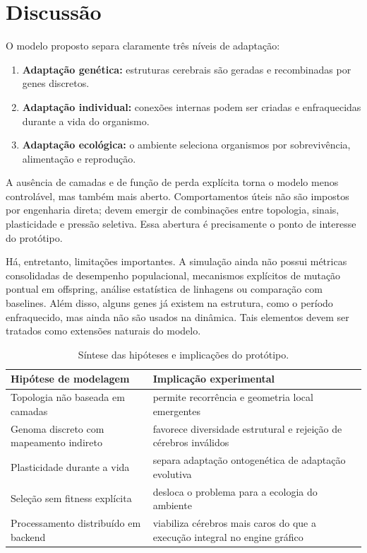 \documentclass[12pt,a4paper,fleqn]{article}
\begin{document}
\section{Discussão}

O modelo proposto separa claramente três níveis de adaptação:

\begin{enumerate}
	\item \textbf{Adaptação genética:} estruturas cerebrais são geradas e recombinadas por genes discretos.
	\item \textbf{Adaptação individual:} conexões internas podem ser criadas e enfraquecidas durante a vida do organismo.
	\item \textbf{Adaptação ecológica:} o ambiente seleciona organismos por sobrevivência, alimentação e reprodução.
\end{enumerate}

A ausência de camadas e de função de perda explícita torna o modelo menos controlável, mas também mais aberto. Comportamentos úteis não são impostos por engenharia direta; devem emergir de combinações entre topologia, sinais, plasticidade e pressão seletiva. Essa abertura é precisamente o ponto de interesse do protótipo.

Há, entretanto, limitações importantes. A simulação ainda não possui métricas consolidadas de desempenho populacional, mecanismos explícitos de mutação pontual em offspring, análise estatística de linhagens ou comparação com baselines. Além disso, alguns genes já existem na estrutura, como o período enfraquecido, mas ainda não são usados na dinâmica. Tais elementos devem ser tratados como extensões naturais do modelo.

\begin{table}[H]
\centering
\caption{Síntese das hipóteses e implicações do protótipo.}
\label{tab:hipoteses}
\begin{tabular}{p{5.1cm}p{8.9cm}}
\toprule
Hipótese de modelagem & Implicação experimental \\
\midrule
Topologia não baseada em camadas & permite recorrência e geometria local emergentes \\
Genoma discreto com mapeamento indireto & favorece diversidade estrutural e rejeição de cérebros inválidos \\
Plasticidade durante a vida & separa adaptação ontogenética de adaptação evolutiva \\
Seleção sem fitness explícita & desloca o problema para a ecologia do ambiente \\
Processamento distribuído em backend & viabiliza cérebros mais caros do que a execução integral no engine gráfico \\
\bottomrule
\end{tabular}
\end{table}
\end{document}
